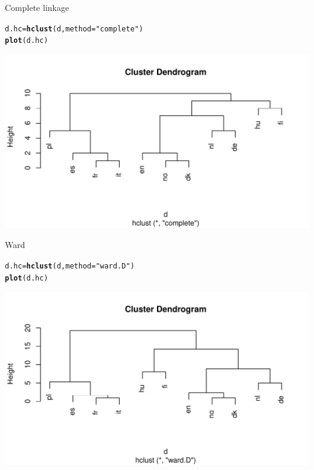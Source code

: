 \documentclass[unknownkeysallowed]{beamer}\usepackage[]{graphicx}\usepackage[]{color}
\makeatletter
\def\maxwidth{ %
  \ifdim\Gin@nat@width>\linewidth
    \linewidth
  \else
    \Gin@nat@width
  \fi
}
\newcommand{\hlstr}[1]{\textcolor[rgb]{0.192,0.494,0.8}{#1}}%
\newcommand{\hlstd}[1]{\textcolor[rgb]{0.345,0.345,0.345}{#1}}%
\newcommand{\hlkwb}[1]{\textcolor[rgb]{0.69,0.353,0.396}{#1}}%
\newcommand{\hlkwc}[1]{\textcolor[rgb]{0.333,0.667,0.333}{#1}}%
\newcommand{\hlkwd}[1]{\textcolor[rgb]{0.737,0.353,0.396}{\textbf{#1}}}%
\newenvironment{kframe}{%
 \def\at@end@of@kframe{}%
 \ifinner\ifhmode%
  \def\at@end@of@kframe{\end{minipage}}%
  \begin{minipage}{\columnwidth}%
 \fi\fi%
 \def\FrameCommand##1{\hskip\@totalleftmargin \hskip-\fboxsep
 \colorbox{shadecolor}{##1}\hskip-\fboxsep
     \hskip-\linewidth \hskip-\@totalleftmargin \hskip\columnwidth}%
 \MakeFramed {\advance\hsize-\width
   \@totalleftmargin\z@ \linewidth\hsize
   \@setminipage}}%
 {\par\unskip\endMakeFramed%
 \at@end@of@kframe}
\newenvironment{knitrout}{}{} %
\makeatother
\begin{document}
\begin{frame}[fragile]{Complete linkage}
  
\begin{knitrout}
\color{fgcolor}\begin{kframe}
\begin{alltt}
\hlstd{d.hc}\hlkwb{=}\hlkwd{hclust}\hlstd{(d,}\hlkwc{method}\hlstd{=}\hlstr{"complete"}\hlstd{)}
\hlkwd{plot}\hlstd{(d.hc)}
\end{alltt}
\end{kframe}
\includegraphics[width=\maxwidth]{figure/unnamed-chunk-328-1} 

\end{knitrout}
  
\end{frame}

\begin{frame}[fragile]{Ward}
  
\begin{knitrout}
\color{fgcolor}\begin{kframe}
\begin{alltt}
\hlstd{d.hc}\hlkwb{=}\hlkwd{hclust}\hlstd{(d,}\hlkwc{method}\hlstd{=}\hlstr{"ward.D"}\hlstd{)}
\hlkwd{plot}\hlstd{(d.hc)}
\end{alltt}
\end{kframe}
\includegraphics[width=\maxwidth]{figure/wardo-1} 

\end{knitrout}
  
\end{frame}
\end{document}

